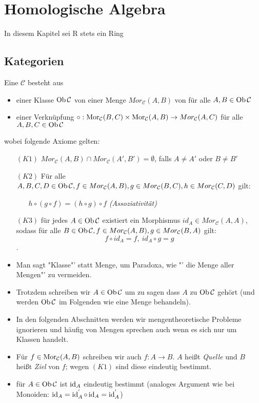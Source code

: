 \newpage
\section{Homologische Algebra}
\begin{center}
	In diesem Kapitel sei R stets ein Ring
\end{center}
\setcounter{subsection}{3}
\subsection{Kategorien}
\begin{df}\label{2.4}
	Eine  $ \mathcal{C} $ besteht aus 
	\begin{itemize}
		\item einer Klasse $\text{Ob}\,\mathcal{C}$ von 
			einer Menge $Mor_{\mathcal{C}}(A,B) $ von  für alle $A,B \in \text{Ob}\,\mathcal{C}$
		\item einer Verknüpfung $\circ : \text{Mor}_{\mathcal{C}}(B,C) \times \text{Mor}_{\mathcal{C}}(A,B) \to Mor_{\mathcal{C}}(A,C) $ für alle $A,B,C \in \text{Ob}\,\mathcal{C}$
	\end{itemize}
	wobei folgende Axiome gelten:
	\begin{enumerate}
		\item[$(K1)$] $Mor_{\mathcal{C}}(A,B) \cap Mor_{\mathcal{C}}(A',B') = \emptyset$, falls $A \neq A'$ oder $B \neq B'$
		\item[$(K2)$] Für alle $A,B,C,D \in \text{Ob}\,\mathcal{C}, f \in Mor_{\mathcal{C}}(A,B), g \in Mor_{\mathcal{C}}(B,C), h \in Mor_{\mathcal{C}}(C,D)$ gilt:
		\begin{enumerate}
			\item[] $h \circ (g \circ f) = (h \circ g) \circ f$ \hfill \emph{(Assoziativität)}
		\end{enumerate}
		\item[$(K3)$] für jedes $ A \in \text{Ob}\,\mathcal{C}$ existiert ein Morphismus $id_A \in Mor_{\mathcal{C}}(A,A)$, sodass für alle $B \in \text{Ob}\,\mathcal{C}, f \in Mor_{\mathcal{C}}(A,B), g \in Mor_{\mathcal{C}}(B,A)$ gilt: $$f \circ id_A = f, \ id_A \circ g = g $$.
	\end{enumerate}
\end{df}
\begin{anm}
	\begin{itemize}
		\item Man sagt "Klasse"' statt Menge, um Paradoxa, wie "' die Menge aller Mengen"' zu vermeiden.
		\item Trotzdem schreiben wir $A \in \text{Ob}\,\mathcal{C}$ um zu sagen dass $A$ zu $\text{Ob}\,\mathcal{C}$ gehört (und werden $\text{Ob}\,\mathcal{C}$ im Folgenden wie eine Menge behandeln).
		\item In den folgenden Abschnitten werden wir mengentheoretische Probleme ignorieren und häufig von Mengen sprechen auch wenn es sich nur um Klassen handelt.
		\item Für $f \in \text{Mor}_{\mathcal{C}}(A,B)$ schreiben wir auch $f: A \to B $. $A$ heißt \emph{Quelle} und $B$ heißt \emph{Ziel} von $f$; wegen $(K1)$ sind diese eindeutig bestimmt.
		\item für $A \in \text{Ob}\,\mathcal{C}$ ist $\operatorname{id}_A$ eindeutig bestimmt (analoges Argument wie bei Monoiden: $\operatorname{id}_A = \operatorname{id}_A^{'} \circ \operatorname{id}_A = \operatorname{id}_A^{'}$)
	\end{itemize}
\end{anm}
